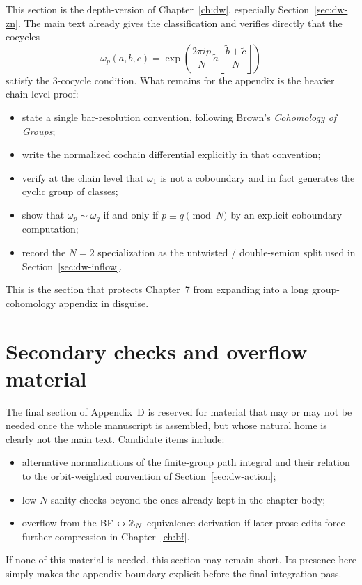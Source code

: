 This section is the depth-version of Chapter~\ref{ch:dw}, especially Section~\ref{sec:dw-zn}. The main text already gives the classification and verifies directly that the cocycles
\begin{equation*}
\omega_p(a,b,c)
=
\exp\!\left(\frac{2\pi i p}{N}\,\widetilde a\left\lfloor \frac{\widetilde b+\widetilde c}{N}\right\rfloor\right)
\end{equation*}
satisfy the $3$-cocycle condition. What remains for the appendix is the heavier chain-level proof:
\begin{itemize}
\item state a single bar-resolution convention, following Brown's \emph{Cohomology of Groups};
\item write the normalized cochain differential explicitly in that convention;
\item verify at the chain level that $\omega_1$ is not a coboundary and in fact generates the cyclic group of classes;
\item show that $\omega_p\sim \omega_q$ if and only if $p\equiv q \pmod N$ by an explicit coboundary computation;
\item record the $N=2$ specialization as the untwisted / double-semion split used in Section~\ref{sec:dw-inflow}.
\end{itemize}
This is the section that protects Chapter~7 from expanding into a long group-cohomology appendix in disguise.

\section{Secondary checks and overflow material}\label{sec:appD-secondary}

The final section of Appendix~D is reserved for material that may or may not be needed once the whole manuscript is assembled, but whose natural home is clearly not the main text. Candidate items include:
\begin{itemize}
\item alternative normalizations of the finite-group path integral and their relation to the orbit-weighted convention of Section~\ref{sec:dw-action};
\item low-$N$ sanity checks beyond the ones already kept in the chapter body;
\item overflow from the BF $\leftrightarrow \mathbb{Z}_N$ equivalence derivation if later prose edits force further compression in Chapter~\ref{ch:bf}.
\end{itemize}
If none of this material is needed, this section may remain short. Its presence here simply makes the appendix boundary explicit before the final integration pass.

